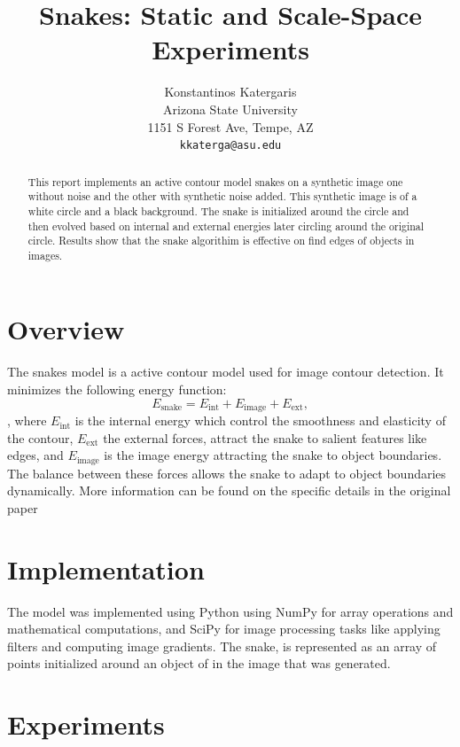 \documentclass[10pt,twocolumn,letterpaper]{article}
\begin{document}
\title{Snakes: Static and Scale-Space Experiments}

\author{Konstantinos Katergaris\\
Arizona State University\\
1151 S Forest Ave, Tempe, AZ\\
{\tt\small kkaterga@asu.edu}}


\maketitle
\begin{abstract}
This report implements an active contour model snakes on a synthetic image one without noise and the other with synthetic noise added. This synthetic image is of a white circle and a black background. The snake is initialized around the circle and then evolved based on internal and external energies later circling around the original circle. Results show that the snake algorithim is effective on find edges of objects in images.
\end{abstract}
\section{Overview}
The snakes model is a active contour model  used for image contour detection. It minimizes the following energy function: \[ E_{\text{snake}} = E_{\text{int}} + E_{\text{image}} + E_{\text{ext}},\], where $E_{\text{int}}$ is the internal energy which control the smoothness and elasticity of the contour,  $E_{\text{ext}}$ the external forces, attract the snake to salient features like edges, and $E_{\text{image}}$ is the image energy attracting the snake to object boundaries. The balance between these forces allows the snake to adapt to object boundaries dynamically. More information can be found on the specific details in the original paper\cite{kass1988snakes}

\section{Implementation}
The model was implemented using Python using NumPy for array operations and mathematical computations, and SciPy for image processing tasks like applying filters and computing image gradients. The snake, is represented as an array of points initialized around an object of in the image that was generated. 
\section{Experiments}
\end{document}
